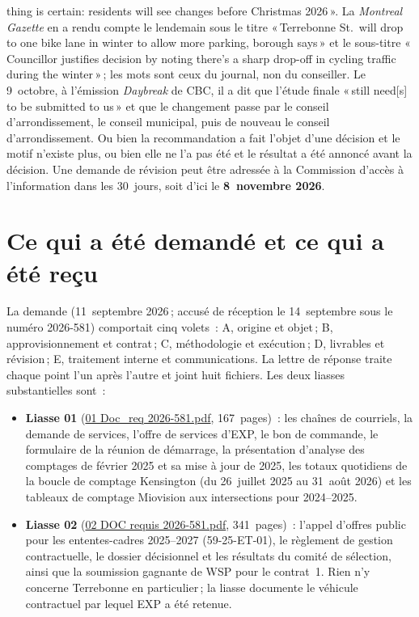 \documentclass[11pt,letterpaper]{article}
\newcommand{\repourl}{https://github.com/OpenMobilityData/Terrebonne-access-requests}
\newcommand{\doc}[2]{\href{\repourl/blob/main/#1}{#2}}
\begin{document}
\begin{enumerate}[nosep]
\begin{minipage}[t]{\linewidth}
    thing is certain: residents will see changes before Christmas 2026\,».
    La \emph{Montreal Gazette} en a rendu compte le lendemain sous le titre
    «\,Terrebonne St.~will drop to one bike lane in winter to allow more
    parking, borough says\,» et le sous-titre «\,Councillor justifies
    decision by noting there's a sharp drop-off in cycling traffic during
    the winter\,»\,; les mots sont ceux du journal, non du conseiller.
    Le 9~octobre, à l'émission \emph{Daybreak} de CBC, il a dit que l'étude
    finale «\,still need[s] to be submitted to us\,» et que le changement
    passe par le conseil d'arrondissement, le conseil municipal, puis de
    nouveau le conseil d'arrondissement.
    Ou bien la recommandation a fait l'objet d'une décision et le motif
    n'existe plus, ou bien elle ne l'a pas été et le résultat a été annoncé
    avant la décision. Une demande de révision peut être
    adressée à la Commission d'accès à l'information dans les 30~jours, soit
    d'ici le \textbf{8~novembre 2026}.\end{minipage}\vspace{0.35em}
\end{enumerate}

\section{Ce qui a été demandé et ce qui a été reçu}

La demande (11~septembre 2026\,; accusé de réception le 14~septembre sous le
numéro 2026-581) comportait cinq volets~: A, origine et objet\,; B,
approvisionnement et contrat\,; C, méthodologie et exécution\,; D, livrables
et révision\,; E, traitement interne et communications. La lettre de réponse
traite chaque point l'un après l'autre et joint huit fichiers. Les deux
liasses substantielles sont~:

\begin{itemize}[nosep]
  \item \textbf{Liasse 01} (\doc{2026-581/raw/01_emails_mandate_counts.pdf}{01 Doc\_req
    2026-581.pdf}, 167~pages)~: les chaînes de courriels, la demande de
    services, l'offre de services d'EXP, le bon de commande, le formulaire de
    la réunion de démarrage, la présentation d'analyse des comptages de
    février 2025 et sa mise à jour de 2025, les totaux quotidiens de la
    boucle de comptage Kensington (du 26~juillet 2025 au 31~août 2026) et les
    tableaux de comptage Miovision aux intersections pour 2024--2025.
  \item \textbf{Liasse 02} (\doc{2026-581/raw/02_framework_agreement_tender.pdf}{02 DOC requis
    2026-581.pdf}, 341~pages)~: l'appel d'offres public pour les
    ententes-cadres 2025--2027 (59-25-ET-01), le règlement de gestion
    contractuelle, le dossier décisionnel et les résultats du comité de
    sélection, ainsi que la soumission gagnante de WSP pour le contrat~1.
    Rien n'y concerne Terrebonne en particulier\,; la liasse documente le
    véhicule contractuel par lequel EXP a été retenue.
\end{itemize}
\end{document}
